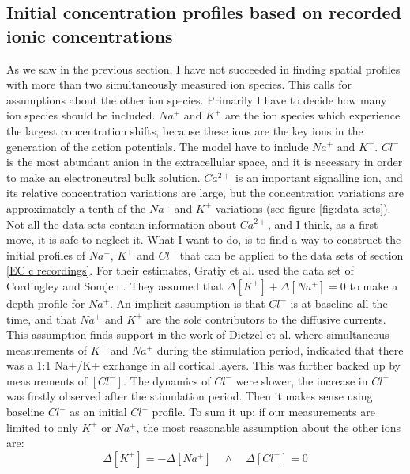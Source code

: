 \documentclass{article}
\begin{document}
\subsection{Initial concentration profiles based on recorded ionic concentrations}\label{Initial concentration profiles}
As we saw in the previous section, I have not succeeded in finding spatial profiles with more than two simultaneously measured ion species. This calls for assumptions about the other ion species. Primarily I have to decide how many ion species should be included. $Na^+$ and $K^+$ are the ion species which experience the largest concentration shifts, because these ions are the key ions in the generation of the action potentials. The model have to include $Na^+$ and $K^+$. $Cl^-$ is the most abundant anion in the extracellular space, and it is necessary in order to make an electroneutral bulk solution. $Ca^{2+}$ is an important signalling ion, and its relative concentration variations are large, but the concentration variations are approximately a tenth of the $Na^+$ and $K^+$ variations (see figure \ref{fig:data sets}). Not all the data sets contain information about $Ca^{2+}$, and I think, as a first move, it is safe to neglect it. What I want to do, is to find a way to construct the initial profiles of $Na^+$, $K^+$ and $Cl^-$ that can be applied to the data sets of section \ref{EC c recordings}. For their estimates, Gratiy et al. used the data set of Cordingley and Somjen \cite{CordingleySomjen}. They assumed that $\Delta [K^+] + \Delta [Na^+] = 0$ to make a depth profile for $Na^+$. An implicit assumption is that $Cl^-$ is at baseline all the time, and that $Na^+$ and $K^+$ are the sole contributors to the diffusive currents. This assumption finds support in the work of Dietzel et al. \cite{Dietzel1982} where simultaneous measurements of $K^+$ and $ Na^+$ during the stimulation period, indicated that there was a 1:1 Na+/K+ exchange in all cortical layers. This was further backed up by measurements of $[Cl^-]$. The dynamics of $Cl^-$ were slower, the increase in $Cl^-$ was firstly observed after the stimulation period. Then it makes sense using baseline $Cl^-$ as an initial $Cl^-$ profile. 
To sum it up: if our measurements are limited to only $K^+$ or $Na^+$, the most reasonable assumption about the other ions are:
 $$\Delta [K^+] =  -\Delta [Na^+] \quad \land \quad \Delta [Cl^-] =0$$ 
 
\end{document}
